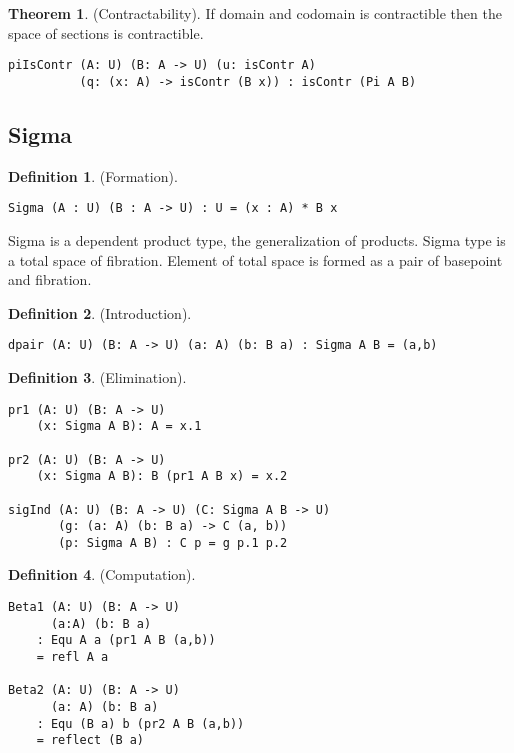\documentclass{article}
\theoremstyle{definition}
\newtheorem{definition}{Definition}
\newtheorem{theorem}{Theorem}
\begin{document}
\begin{theorem} (Contractability).
If domain and codomain is contractible then the space of sections is contractible.
\begin{lstlisting}
piIsContr (A: U) (B: A -> U) (u: isContr A)
          (q: (x: A) -> isContr (B x)) : isContr (Pi A B)
\end{lstlisting}
\end{theorem}

\subsection{Sigma}

\begin{definition} (Formation).
\begin{lstlisting}
Sigma (A : U) (B : A -> U) : U = (x : A) * B x
\end{lstlisting}
\end{definition}
Sigma is a dependent product type, the generalization of products.
Sigma type is a total space of fibration. Element of total
space is formed as a pair of basepoint and fibration.

\begin{definition} (Introduction).
\begin{lstlisting}
dpair (A: U) (B: A -> U) (a: A) (b: B a) : Sigma A B = (a,b)
\end{lstlisting}
\end{definition}

\begin{definition} (Elimination).
\begin{lstlisting}
pr1 (A: U) (B: A -> U)
    (x: Sigma A B): A = x.1

pr2 (A: U) (B: A -> U)
    (x: Sigma A B): B (pr1 A B x) = x.2

sigInd (A: U) (B: A -> U) (C: Sigma A B -> U)
       (g: (a: A) (b: B a) -> C (a, b))
       (p: Sigma A B) : C p = g p.1 p.2
\end{lstlisting}
\end{definition}

\begin{definition} (Computation).
\begin{lstlisting}
Beta1 (A: U) (B: A -> U)
      (a:A) (b: B a)
    : Equ A a (pr1 A B (a,b))
    = refl A a

Beta2 (A: U) (B: A -> U)
      (a: A) (b: B a)
    : Equ (B a) b (pr2 A B (a,b))
    = reflect (B a)
\end{lstlisting}
\end{definition}
\end{document}
